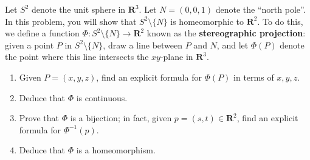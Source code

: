 \documentclass{article}
\newcommand{\R}{\mathbf{R}}
\theoremstyle{plain} %
\numberwithin{thm}{section} %
\theoremstyle{definition}
\begin{document}
        Let $S^2$ denote the unit sphere in $\R^3$. Let $N=(0,0,1)$ denote the ``north pole''. In this problem, you will show that $S^2\setminus \{N\}$ is homeomorphic to $\R^2$. To do this, we define a function $\Phi:S^2\setminus \{N\}\rightarrow \R^2$ known as the \textbf{stereographic projection}: given a point $P$ in $S^2\setminus \{N\}$, draw a line between $P$ and $N$, and let $\Phi(P)$ denote the point where this line intersects the $xy$-plane in $\R^3$.
        \begin{enumerate}[label=(\alph*)]
            \item Given $P=(x,y,z)$, find an explicit formula for $\Phi(P)$ in terms of $x,y,z$.
            \item Deduce that $\Phi$ is continuous.
            \item Prove that $\Phi$ is a bijection; in fact, given $p=(s,t)\in \R^2$, find an explicit formula for $\Phi^{-1}(p)$.
            \item Deduce that $\Phi$ is a homeomorphism.
        \end{enumerate}
\end{document}
